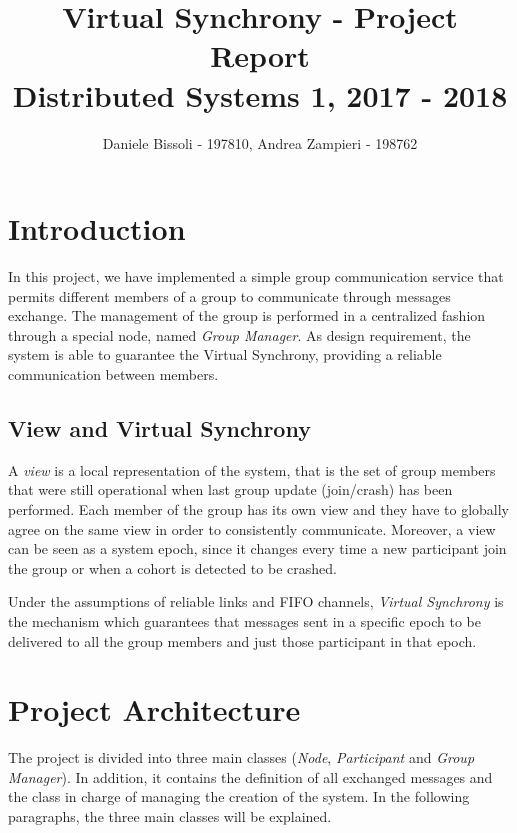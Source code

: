 \documentclass[11pt]{article}
\title{\LARGE{\textbf{Virtual Synchrony - Project Report}\\[0mm]\large{Distributed Systems 1, 2017 - 2018}}}
\author{Daniele Bissoli - 197810, Andrea Zampieri - 198762}
\date{}
\begin{document}
	\maketitle
	
	\section{Introduction}
	In this project, we have implemented a simple group communication service that permits different members of a group to communicate through messages exchange. The management of the group is performed in a centralized fashion through a special node, named \textit{Group Manager}. As design requirement, the system is able to guarantee the Virtual Synchrony, providing a reliable communication between members.
	
	\subsection{View and Virtual Synchrony}
	A \textit{view} is a local representation of the system, that is the set of group members that were still operational when last group update (join/crash) has been performed. Each member of the group has its own view and they have to globally agree on the same view in order to consistently communicate. Moreover, a view can be seen as a system epoch, since it changes every time a new participant join the group or when a cohort is detected to be crashed.
	
	Under the assumptions of reliable links and FIFO channels, \textit{Virtual Synchrony} is the mechanism which guarantees that messages sent in a specific epoch to be delivered to all the group members and just those participant in that epoch.
	
	\section{Project Architecture}
	The project is divided into three main classes (\textit{Node}, \textit{Participant} and \textit{Group Manager}). In addition, it contains the definition of all exchanged messages and the class in charge of managing the creation of the system. In the following paragraphs, the three main classes will be explained.
	
\end{document}
